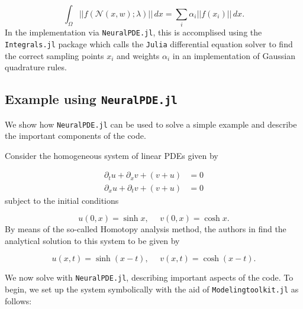 \documentclass{CUP-JNL-DTM}%
\theoremstyle{definition}
\numberwithin{equation}{section}
\newcommand{\Julia}{\texttt{Julia} }
\newcommand{\net}{\mathcal{N}}
\begin{document}
\begin{equation}
	\int_{\Omega} ||f(\net(x,w); \lambda)||\,dx = \sum_i \alpha_i ||f(x_i)||\,dx.
\end{equation}
In the implementation via \texttt{NeuralPDE.jl}, this is accomplised using the \texttt{Integrals.jl} package which calls the \Julia differential equation solver \cite{rackauckasDifferentialEquationsJlPerformant2017} to find the correct sampling points $x_i$ and weights $\alpha_i$ in an implementation of Gaussian quadrature rules. 

\subsection{Example using \texttt{NeuralPDE.jl}}

We show how \texttt{NeuralPDE.jl} can be used to solve a simple example and describe the important components of the code. 

Consider the homogeneous system of linear PDEs given by

\begin{equation}
\begin{split}
	\partial_t u + \partial_x v + (v + u) & = 0 \\
	\partial_x u + \partial_t v + (v + u) & = 0
\end{split}
\end{equation}
subject to the initial conditions 

\begin{equation}
	u(0,x) = \sinh x, \,\,\,\,\,\,\,\, v(0,x) = \cosh x. 
\end{equation}    
By means of the so-called Homotopy analysis method, the authors in \cite{samibatainehApproximateAnalyticalSolutions2008} find the analytical solution to this system to be given by 

\begin{equation}
	u(x,t) = \sinh(x - t), \,\,\,\,\,\,\,\, v(x,t) = \cosh(x - t). 
\end{equation}

We now solve with \texttt{NeuralPDE.jl}, describing important aspects of the code. To begin, we set up the system symbolically with the aid of \texttt{Modelingtoolkit.jl} as follows:
\end{document}

